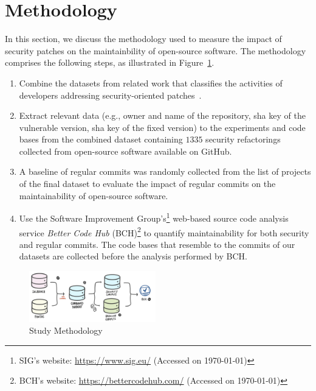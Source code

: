 \documentclass[10pt,conference]{IEEEtran}
\begin{document}
\section{Methodology}\label{sec:methodology}
%
In this section, we discuss the methodology used to measure
the impact of security patches on the maintainbility of open-source
software. The methodology comprises the following steps, as illustrated in
Figure~\ref{fig:met}.
%
\begin{enumerate}
	\item Combine the datasets from related work that classifies
the activities of developers addressing security-oriented patches~\cite{Reis:2017:IJSSE, 10.1109/MSR.2019.00064}.
%
	\item
	Extract relevant data (e.g., owner and name of
	the repository, sha key of the vulnerable version, sha key of the fixed version) to the experiments and 
	code bases from the combined dataset containing $1335$ security
	refactorings collected from open-source software available on
	GitHub.
%
	\item A baseline of regular commits was randomly collected from the list of
	projects of the final dataset to evaluate the impact of regular commits on the
	maintainability of open-source software.
%
  \item Use the Software Improvement Group's\footnote{SIG's website: \url{https://www.sig.eu/} 
  (Accessed on \today{})} web-based source code analysis
  service \emph{Better Code Hub} (BCH)\footnote{BCH's website:
  \url{https://bettercodehub.com/} (Accessed on \today{})} to quantify maintainability
  for both security and regular commits. The code bases that resemble to the commits
  of our datasets are collected before the analysis performed by BCH.
\end{enumerate}
%
\begin{figure}[h]
	 	\centering 	
    \begin{adjustwidth}{0.5cm}{-1cm}  
	\includegraphics[width=0.49\textwidth]{figures/methodology.pdf}
 	\vspace{-0.1cm}
	
 	\caption{Study Methodology}
	\label{fig:met}
	 \end{adjustwidth}
 	\vspace{-0.1cm}
\end{figure}
%
\end{document}
